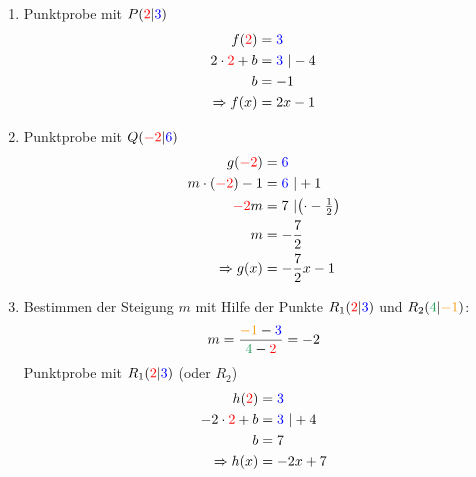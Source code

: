\begin{Answer}[ref=punktprobeA2]

	\begin{minipage}[t]{0.5\textwidth}
		\begin{enumerate}[label=\alph*)]
			\item Punktprobe mit \(P(\textcolor{red}{2}\vert\textcolor{blue}{3})\)
			\begin{align*}
				f(\textcolor{red}{2})&=\textcolor{blue}{3}\\
				2\cdot\textcolor{red}{2}+b&=\textcolor{blue}{3}\ \vert-4\\
				b&=-1\\
				\Rightarrow f(x)&=2x-1
			\end{align*}
			\item Punktprobe mit \(Q(\textcolor{red}{-2}\vert\textcolor{blue}{6})\)
			\begin{align*}
				g(\textcolor{red}{-2})&=\textcolor{blue}{6}\\
				m\cdot\left(\textcolor{red}{-2}\right)-1&=\textcolor{blue}{6}\ \vert+1\\
				\textcolor{red}{-2}m&=7\ \vert\left(\cdot -\tfrac{1}{2}\right)\\
				m&=-\dfrac{7}{2}\\
				\Rightarrow g(x)&=-\dfrac{7}{2}x-1
			\end{align*}
		\end{enumerate}
	\end{minipage}%
	\begin{minipage}[t]{0.5\textwidth}
		\begin{enumerate}[label=\alph*)]
			\setcounter{enumi}{2}
			\item Bestimmen der Steigung \(m\) mit Hilfe der Punkte \(R_1(\textcolor{red}{2}\vert\textcolor{blue}{3})\) und \(R_2(\textcolor{ForestGreen}{4}\vert\textcolor{YellowOrange}{-1})\):
			\begin{align*}
				m=\dfrac{\textcolor{YellowOrange}{-1}-\textcolor{blue}{3}}{\textcolor{ForestGreen}{4}-\textcolor{red}{2}}=-2
			\end{align*}
			Punktprobe mit \(R_1(\textcolor{red}{2}\vert\textcolor{blue}{3})\) (oder \(R_2\))
			\begin{align*}
				h(\textcolor{red}{2})&=\textcolor{blue}{3}\\
				-2\cdot\textcolor{red}{2}+b&=\textcolor{blue}{3}\ \vert +4\\
				b&=7\\
				\Rightarrow h(x)&=-2x+7
			\end{align*}

\end{enumerate}
\end{minipage}
\end{Answer}
